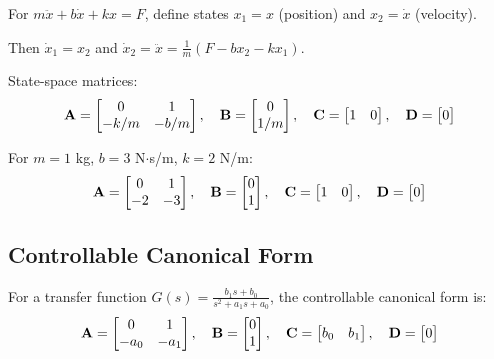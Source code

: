 \begin{examplebox}[title=Example 4.3: Mass-Spring-Damper State-Space Model]
For $m\ddot{x} + b\dot{x} + kx = F$, define states $x_1 = x$ (position) and $x_2 = \dot{x}$ (velocity).

Then $\dot{x}_1 = x_2$ and $\dot{x}_2 = \ddot{x} = \frac{1}{m}(F - bx_2 - kx_1)$.

State-space matrices:
\begin{equation}
\mathbf{A} = \begin{bmatrix} 0 & 1 \\ -k/m & -b/m \end{bmatrix}, \quad
\mathbf{B} = \begin{bmatrix} 0 \\ 1/m \end{bmatrix}, \quad
\mathbf{C} = \begin{bmatrix} 1 & 0 \end{bmatrix}, \quad
\mathbf{D} = \begin{bmatrix} 0 \end{bmatrix}
\end{equation}

For $m = 1$ kg, $b = 3$ N$\cdot$s/m, $k = 2$ N/m:
\begin{equation}
\mathbf{A} = \begin{bmatrix} 0 & 1 \\ -2 & -3 \end{bmatrix}, \quad
\mathbf{B} = \begin{bmatrix} 0 \\ 1 \end{bmatrix}, \quad
\mathbf{C} = \begin{bmatrix} 1 & 0 \end{bmatrix}, \quad
\mathbf{D} = \begin{bmatrix} 0 \end{bmatrix}
\end{equation}
\end{examplebox}

\subsection{Controllable Canonical Form}

For a transfer function $G(s) = \frac{b_1s + b_0}{s^2 + a_1s + a_0}$, the controllable canonical form is:
\begin{equation}
\mathbf{A} = \begin{bmatrix} 0 & 1 \\ -a_0 & -a_1 \end{bmatrix}, \quad
\mathbf{B} = \begin{bmatrix} 0 \\ 1 \end{bmatrix}, \quad
\mathbf{C} = \begin{bmatrix} b_0 & b_1 \end{bmatrix}, \quad
\mathbf{D} = \begin{bmatrix} 0 \end{bmatrix}
\label{eq:ccf}
\end{equation}

